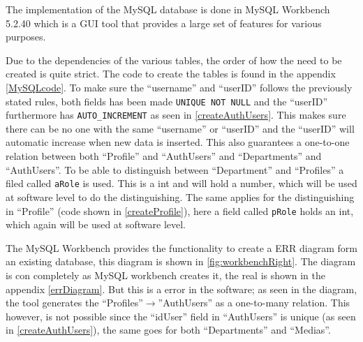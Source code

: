 The implementation of the MySQL database is done in MySQL Workbench 5.2.40 which is a GUI tool that provides a large set of features for various purposes.

Due to the dependencies of the various tables, the order of how the need to be created is quite strict. 
The code to create the tables is found in the appendix \autoref{MySQLcode}. To make sure the ``username'' and ``userID'' follows the previously stated rules, both fields has been made \verb+UNIQUE NOT NULL+ and the ``userID'' furthermore has \verb+AUTO_INCREMENT+ as seen in \autoref{createAuthUsers}. This makes sure there can be no one with the same ``username'' or ``userID'' and the ``userID'' will automatic increase when new data is inserted. 
This also guarantees a one-to-one relation between both ``Profile'' and ``AuthUsers'' and ``Departments'' and ``AuthUsers''. To be able to distinguish between ``Department'' and ``Profiles'' a filed called \verb+aRole+ is used. 
This is a int and will hold a number, which will be used at software level to do the distinguishing. The same applies for the distinguishing in ``Profile'' (code shown in \autoref{createProfile}), here a field called \verb+pRole+ holds an int, which again will be used at software level.

The MySQL Workbench provides the functionality to create a ERR diagram form an existing database, this diagram is shown in \autoref{fig:workbenchRight}. The diagram is con completely as MySQL workbench creates it, the real is shown in the appendix \autoref{errDiagram}. But this is a error in the software; as seen in the diagram, the tool generates the ``Profiles''$\rightarrow$''AuthUsers'' as a one-to-many relation. This however, is not possible since the ``idUser'' field in ``AuthUsers'' is unique (as seen in \autoref{createAuthUsers}), the same goes for both ``Departments'' and ``Medias''.

